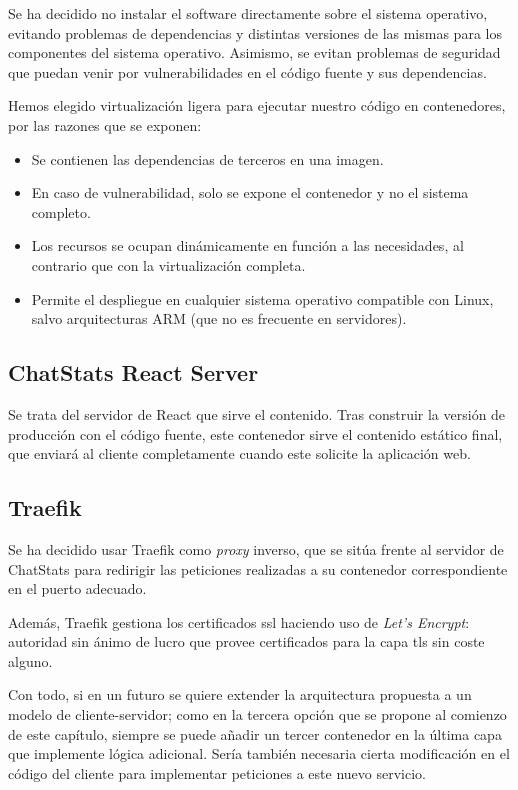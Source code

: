 Se ha decidido no instalar el software directamente sobre el sistema operativo, evitando problemas de dependencias y distintas versiones de las mismas para los componentes del sistema operativo. Asimismo, se evitan problemas de seguridad que puedan venir por vulnerabilidades en el código fuente y sus dependencias.

Hemos elegido virtualización ligera para ejecutar nuestro código en contenedores, por las razones que se exponen:

\begin{itemize}
	\item Se contienen las dependencias de terceros en una imagen.
	\item En caso de vulnerabilidad, solo se expone el contenedor y no el sistema completo.
	\item Los recursos se ocupan dinámicamente en función a las necesidades, al contrario que con la virtualización completa.
	\item Permite el despliegue en cualquier sistema operativo compatible con Linux, salvo arquitecturas ARM (que no es frecuente en servidores).
\end{itemize}

\subsection{ChatStats React Server}

Se trata del servidor de React que sirve el contenido. Tras construir la versión de producción con el código fuente, este contenedor sirve el contenido estático final, que enviará al cliente completamente cuando este solicite la aplicación web.

\subsection{Traefik}

Se ha decidido usar Traefik como \textit{proxy} inverso, que se sitúa frente al servidor de ChatStats para redirigir las peticiones realizadas a su contenedor correspondiente en el puerto adecuado.

Además, Traefik gestiona los certificados \acrshort{ssl} haciendo uso de \textit{Let's Encrypt}: autoridad sin ánimo de lucro que provee certificados para la capa \acrshort{tls} sin coste alguno.

\vspace{8mm}

Con todo, si en un futuro se quiere extender la arquitectura propuesta a un modelo de cliente-servidor; como en la tercera opción que se propone al comienzo de este capítulo, siempre se puede añadir un tercer contenedor en la última capa que implemente lógica adicional. Sería también necesaria cierta modificación en el código del cliente para implementar peticiones a este nuevo servicio.



